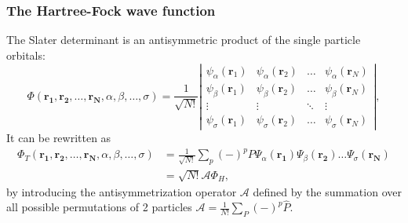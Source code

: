 \documentclass[xcolor=pdftex,hyperref={pdfpagelabels=false},table]{beamer}
\begin{document}
\begin{frame}
\frametitle{The Hartree-Fock wave function}
\begin{scriptsize}
The \alert{Slater determinant} is an antisymmetric product of the single particle orbitals:
\begin{equation}
\Phi(\mathbf{r_1},\mathbf{r_2},\dots,\mathbf{r_N},\alpha,\beta,\dots,\sigma)= \frac{1}{\sqrt{N!}}\left|
 \begin{array}{cccc}
  \psi_{\alpha}(\mathbf{r}_1)&\psi_{\alpha}(\mathbf{r}_2)&\dots&\psi_{\alpha}(\mathbf{r}_N) \\ [4pt]
  \psi_{\beta}(\mathbf{r}_1)&\psi_{\beta}(\mathbf{r}_2)&\dots&\psi_{\beta}(\mathbf{r}_N) \\[4pt]
  \vdots              & \vdots            &\ddots&\vdots\\[4pt]
  \psi_{\sigma}(\mathbf{r}_1)&\psi_{\sigma}(\mathbf{r}_2)&\dots&\psi_{\sigma}(\mathbf{r}_N)
 \end{array}
 \right|,
\end{equation}
It can be rewritten as 
\begin{align}
\Phi_T(\mathbf{r_1},\mathbf{r_2},\dots,\mathbf{r_N}, \alpha, \beta, \dots, \sigma)&=\frac{1}{\sqrt{N!}}\sum_p (-)^p P \Psi_\alpha(\mathbf{r_1})\Psi_\beta(\mathbf{r_2}) \dots \Psi_\sigma(\mathbf{r_N})\\
&=\sqrt{N!} \mathcal{A} \Phi_H,
\end{align}
by introducing the \alert{antisymmetrization operator $\mathcal{A}$} defined by the summation over all possible permutations of 2 particles $\mathcal{A}=\frac{1}{N!} \sum_P (-)^p \hat{P}$.
\end{scriptsize}
\end{frame}
\end{document}
